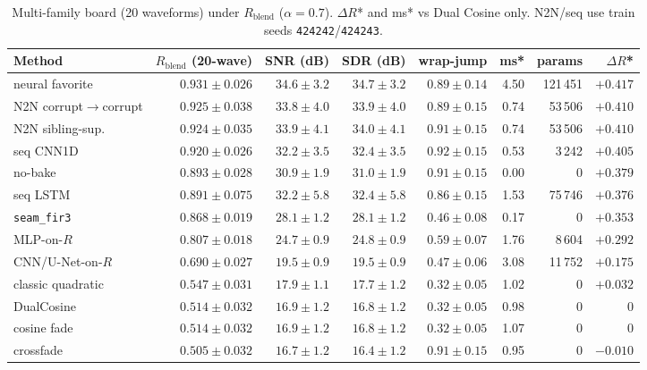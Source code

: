 \begin{table}[htbp]
  \centering
  \caption{Multi-family board (20 waveforms) under $R_{\mathrm{blend}}$ ($\alpha{=}0.7$).
  $\Delta R$* and ms* vs Dual Cosine only. N2N/seq use train seeds \texttt{424242}/\texttt{424243}.}
  \label{tab:sota-main}
  \setlength{\tabcolsep}{2.2pt}
  \begin{adjustbox}{max width=\textwidth}
\begin{tabular}{@{}lrrrrrrr@{}}
    \toprule
    Method & $R_{\mathrm{blend}}$ (20-wave) & SNR (dB) & SDR (dB) & wrap-jump & ms* & params & $\Delta R$* \\
    \midrule
    neural favorite & $0.931\pm0.026$ & $34.6\pm3.2$ & $34.7\pm3.2$ & $0.89\pm0.14$ & 4.50 & 121\,451 & ${+}0.417$ \\
    N2N corrupt$\to$corrupt & $0.925\pm0.038$ & $33.8\pm4.0$ & $33.9\pm4.0$ & $0.89\pm0.15$ & 0.74 & 53\,506 & ${+}0.410$ \\
    N2N sibling-sup. & $0.924\pm0.035$ & $33.9\pm4.1$ & $34.0\pm4.1$ & $0.91\pm0.15$ & 0.74 & 53\,506 & ${+}0.410$ \\
    seq CNN1D & $0.920\pm0.026$ & $32.2\pm3.5$ & $32.4\pm3.5$ & $0.92\pm0.15$ & 0.53 & 3\,242 & ${+}0.405$ \\
    no-bake & $0.893\pm0.028$ & $30.9\pm1.9$ & $31.0\pm1.9$ & $0.91\pm0.15$ & 0.00 & 0 & ${+}0.379$ \\
    seq LSTM & $0.891\pm0.075$ & $32.2\pm5.8$ & $32.4\pm5.8$ & $0.86\pm0.15$ & 1.53 & 75\,746 & ${+}0.376$ \\
    \texttt{seam\_fir3} & $0.868\pm0.019$ & $28.1\pm1.2$ & $28.1\pm1.2$ & $0.46\pm0.08$ & 0.17 & 0 & ${+}0.353$ \\
    MLP-on-$R$ & $0.807\pm0.018$ & $24.7\pm0.9$ & $24.8\pm0.9$ & $0.59\pm0.07$ & 1.76 & 8\,604 & ${+}0.292$ \\
    CNN/U-Net-on-$R$ & $0.690\pm0.027$ & $19.5\pm0.9$ & $19.5\pm0.9$ & $0.47\pm0.06$ & 3.08 & 11\,752 & ${+}0.175$ \\
    classic quadratic & $0.547\pm0.031$ & $17.9\pm1.1$ & $17.7\pm1.2$ & $0.32\pm0.05$ & 1.02 & 0 & ${+}0.032$ \\
    DualCosine & $0.514\pm0.032$ & $16.9\pm1.2$ & $16.8\pm1.2$ & $0.32\pm0.05$ & 0.98 & 0 & $0$ \\
    cosine fade & $0.514\pm0.032$ & $16.9\pm1.2$ & $16.8\pm1.2$ & $0.32\pm0.05$ & 1.07 & 0 & $0$ \\
    crossfade & $0.505\pm0.032$ & $16.7\pm1.2$ & $16.4\pm1.2$ & $0.91\pm0.15$ & 0.95 & 0 & ${-}0.010$ \\

\end{tabular}
\end{adjustbox}
\end{table}
